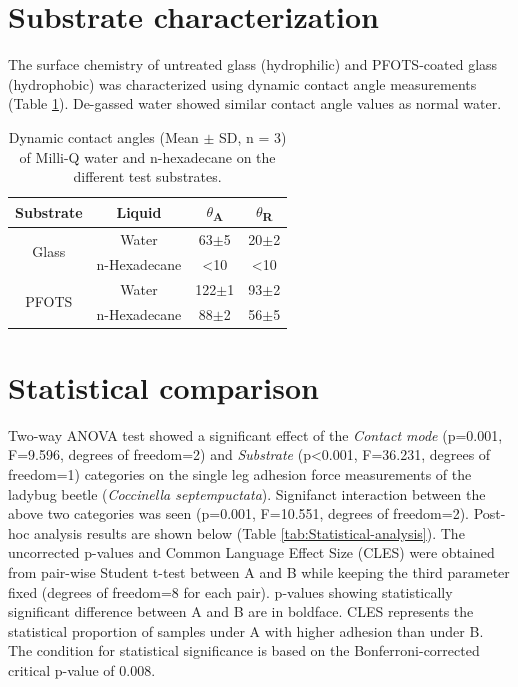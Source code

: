 \documentclass[english]{achemso}
\providecommand{\tabularnewline}{\\}
\begin{document}
\section{Substrate characterization}

The surface chemistry of untreated glass (hydrophilic) and PFOTS-coated glass (hydrophobic) was characterized using dynamic contact angle measurements (Table \ref{tab:Contact-Angles}). De-gassed water showed similar contact angle values as normal water.
\begin{table}[H]
\centering{}%
\begin{tabular}{|c|c|c|c|}
\hline 
Substrate & Liquid & \ensuremath{\theta}\textsubscript{A} & \ensuremath{\theta}\textsubscript{R}\tabularnewline
\hline 
\hline 
\multirow{2}{*}{Glass} & Water & 63\ensuremath{\pm}5\textdegree{} & 20\ensuremath{\pm}2\textdegree{}\tabularnewline
\cline{2-4} \cline{3-4} \cline{4-4} 
 & n-Hexadecane & <10\textdegree{} & <10\textdegree{}\tabularnewline
\hline 
\multirow{2}{*}{PFOTS} & Water & 122\ensuremath{\pm}1\textdegree{} & 93\ensuremath{\pm}2\textdegree{}\tabularnewline
\cline{2-4} \cline{3-4} \cline{4-4} 
 & n-Hexadecane & 88\ensuremath{\pm}2\textdegree{} & 56\ensuremath{\pm}5\textdegree{}\tabularnewline
\hline 
\end{tabular}\caption{Dynamic contact angles (Mean \ensuremath{\pm} SD, n = 3) of Milli-Q water and n-hexadecane on the different test substrates. \label{tab:Contact-Angles}}
\end{table}


\section{Statistical comparison}

Two-way ANOVA test showed a significant effect of the \emph{Contact mode} (p=0.001, F=9.596, degrees of freedom=2) 
and \emph{Substrate} (p<0.001, F=36.231, degrees of freedom=1) categories on the single leg adhesion force measurements
of the ladybug beetle (\emph{Coccinella septempuctata}). Signifanct interaction between the above two categories was seen (p=0.001, F=10.551, degrees of freedom=2). Post-hoc analysis results are shown below (Table \ref{tab:Statistical-analysis}).
The uncorrected p-values and Common Language Effect Size (CLES) were
obtained from pair-wise Student t-test between A and B while
keeping the third parameter fixed (degrees of freedom=8 for each pair). p-values showing statistically
significant difference between A and B are in boldface. 
CLES represents the statistical proportion of samples under A with higher adhesion than under B. The condition
for statistical significance is based on the Bonferroni-corrected
critical p-value of 0.008.
\end{document}
